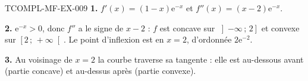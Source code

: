 \begin{corrige}{TCOMPL-MF-EX-009}
\textbf{1.} $f'(x)=(1-x)\mathrm{e}^{-x}$ et
$f''(x)=(x-2)\mathrm{e}^{-x}$.

\textbf{2.} $\mathrm{e}^{-x}>0$, donc $f''$ a le signe de $x-2$ : $f$ est
concave sur $\left]-\infty\,;\,2\right]$ et convexe sur
$\left[2\,;\,+\infty\right[$. Le point d'inflexion est en $x=2$, d'ordonnée
$2\mathrm{e}^{-2}$.

\textbf{3.} Au voisinage de $x=2$ la courbe traverse sa tangente : elle est
au-dessous avant (partie concave) et au-dessus après (partie convexe).
\end{corrige}
